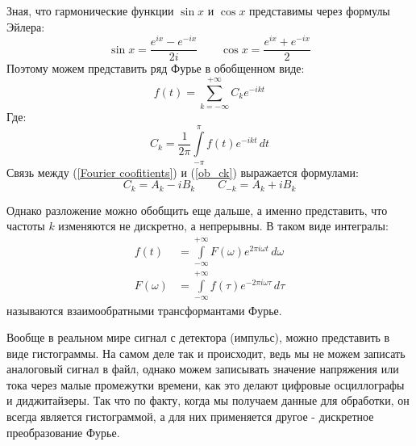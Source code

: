     Зная, что гармонические функции $\sin{x}$ и $\cos{x}$ представимы через формулы Эйлера:
\begin{equation}
    \sin{x} = \frac{e^{ix} - e^{-ix}}{2i}\qquad   \cos{x} = \frac{e^{ix} + e^{-ix}}{2}
\end{equation}
Поэтому можем представить ряд Фурье в обобщенном виде:
\begin{equation}
    f(t) = \sum \limits^{+\infty}_{k = -\infty} C_k e^{-ikt}
\end{equation}
Где:
\begin{equation}
    C_k = \frac1{2\pi}\int \limits_{-\pi}^{\pi}f(t)e^{-ikt}\,dt
    \label{ob_ck}
\end{equation}
Связь между (\ref{Fourier coofitients}) и (\ref{ob_ck}) выражается формулами:
\begin{equation*}
    C_k=A_k - iB_k \qquad C_{-k}= A_k + iB_k
\end{equation*}

Однако разложение можно обобщить еще дальше, а именно представить, что частоты $k$ изменяются не дискретно, а непрерывны. В таком виде интегралы:
\begin{align}
    f(t) & {} = \int \limits^{+\infty}_{-\infty}F(\omega)e^{2\pi i \omega t}\, d\omega\\
    F(\omega) & {}= \int \limits^{+\infty}_{-\infty}f(\tau)e^{-2\pi i \omega \tau}\, d\tau
\end{align}
называются взаимообратными трансформантами Фурье.

Вообще в реальном мире сигнал с детектора (импульс), можно представить в виде гистограммы. На самом деле так и происходит, ведь мы не можем записать аналоговый сигнал в файл, однако можем записывать значение напряжения или тока через малые промежутки времени, как это делают цифровые осциллографы и диджитайзеры. Так что по факту, когда мы получаем данные для обработки, он всегда является гистограммой, а для них применяется другое - дискретное преобразование Фурье.

